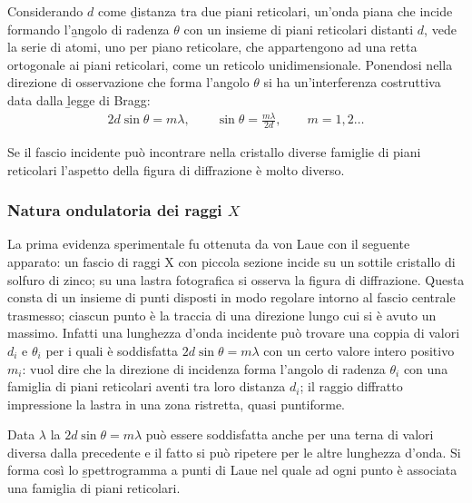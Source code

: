 Considerando $d$ come \b{distanza tra due piani reticolari}, un'onda piana che incide formando l'\b{angolo di radenza} $\theta$ con un insieme di piani reticolari distanti $d$, vede la serie di atomi, uno per piano reticolare, che appartengono ad una retta ortogonale ai piani reticolari, come un reticolo unidimensionale. Ponendosi nella direzione di osservazione che forma l'angolo $\theta$ si ha un'interferenza costruttiva data dalla \b{legge di Bragg}:
\begin{equation}\begin{split}
2d\sin{\theta}=m\lambda, \qquad \sin{\theta}=\frac{m\lambda}{2d}, \qquad m=1,2\dots
\end{split}\end{equation}

Se il fascio incidente può incontrare nella cristallo diverse famiglie di piani reticolari l'aspetto della figura di diffrazione è molto diverso.

\subsubsection{Natura ondulatoria dei raggi $X$}
La prima evidenza sperimentale fu ottenuta da von Laue con il seguente apparato: un fascio di raggi X con piccola sezione incide su un sottile cristallo di solfuro di zinco; su una lastra fotografica si osserva la figura di diffrazione. Questa consta di un insieme di punti disposti in modo regolare intorno al fascio centrale trasmesso; ciascun punto è la traccia di una direzione lungo cui si è avuto un massimo. Infatti una lunghezza d'onda incidente può trovare una coppia di valori $d_i$ e $\theta_i$ per i quali è soddisfatta $2d\sin{\theta}=m\lambda$ con un certo valore intero positivo $m_i$: vuol dire che la direzione di incidenza forma l'angolo di radenza $\theta_i$ con una famiglia di piani reticolari aventi tra loro distanza $d_i$; il raggio diffratto impressione la lastra in una zona ristretta, quasi puntiforme.

Data $\lambda$ la $2d\sin{\theta}=m\lambda$ può essere soddisfatta anche per una terna di valori diversa dalla precedente e il fatto si può ripetere per le altre lunghezza d'onda. Si forma così lo \b{spettrogramma a punti di Laue} nel quale ad ogni punto è associata una famiglia di piani reticolari.